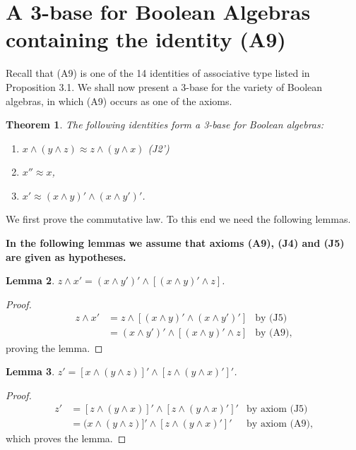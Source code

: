 \documentclass{amsart}
\theoremstyle{plain}
\newtheorem{theorem}{Theorem}[section]
\newtheorem{lemma}[theorem]{Lemma}
\theoremstyle{problem}
\theoremstyle{definition}
\theoremstyle{remark}
\numberwithin{equation}{section}
\begin{document}
\medskip


\section{A 3-base for Boolean Algebras containing the identity (A9)}

       Recall that (A9) is one of the 14 identities of associative type listed in Proposition 3.1.
 We shall now present a 3-base for the variety of Boolean algebras, in which (A9)  occurs as one of the axioms. 
         
\begin{theorem} \label{T8.1}
    The following identities form a 3-base for Boolean algebras:
\begin{enumerate}
   \item[{\rm(A9)}] ${x \land ( y \land z )\approx z \land (y \land x)}$  (J2')   
   \item[{\rm(J4)}]  ${x'' \approx x}$,
   \item[{\rm(J5)}] ${x' \approx (x \land y)' \land (x \land y')'}$.
\end{enumerate}
\end{theorem}
    We first prove the commutative law.   To this end we need the following lemmas. 
    
    {\bf In the following lemmas we assume that  
    axioms (A9), (J4) and (J5) are given as hypotheses.}
    
\begin{lemma} \label{82}
    $ z \land x' = (x \land y')' \land [(x \land y)' \land z]$.
\end{lemma}
\begin{proof}
\begin{align*}
    z \land x'&=  z \land [(x \land y)' \land (x \land y')'] &\text{by (J5)}\\
    &=(x \land y')' \land [(x \land y)' \land z] &\text{by (A9)},
\end{align*}
proving the lemma.
\end{proof}
\begin{lemma} \label{83}
    $ z'  = [x \land (y \land z)]' \land [z \land (y \land x)']' $.
\end{lemma}
\begin{proof}
\begin{align*}
    z' &= [z \land (y \land x)]' \land [z \land (y \land x)']' &\text{by axiom (J5)}\\
       &=(x \land (y \land z)]' \land [z \land (y \land x)']' &\text{by axiom (A9)},
\end{align*}
which proves the lemma.
\end{proof}
\end{document}
